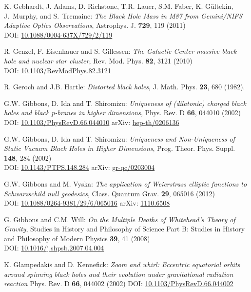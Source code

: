 \begin{thebibliography}{123}
K. Gebhardt, J. Adams, D. Richstone, T.R. Lauer, S.M. Faber, K. Gültekin, J.~Murphy, and S.~Tremaine:
{\em The Black Hole Mass in M87 from Gemini/NIFS Adaptive Optics Observations},
Astrophys. J. {\bf 729}, 119 (2011)\\
DOI: \href{https://doi.org/10.1088/0004-637X/729/2/119}{10.1088/0004-637X/729/2/119}

R. Genzel, F. Eisenhauer and S. Gillessen:
{\em The Galactic Center massive black hole and nuclear star cluster},
Rev. Mod. Phys. {\bf 82}, 3121 (2010)\\
DOI: \href{https://doi.org/10.1103/RevModPhys.82.3121}{10.1103/RevModPhys.82.3121}

R. Geroch and J.B. Hartle:
{\em Distorted black holes},
J. Math. Phys. {\bf 23}, 680 (1982).

G.W. Gibbons, D. Ida and T. Shiromizu:
{\em Uniqueness of (dilatonic) charged black holes and black p-branes in higher dimensions},
Phys. Rev. D {\bf 66}, 044010 (2002)\\
DOI: \href{https://doi.org/10.1103/PhysRevD.66.044010}{10.1103/PhysRevD.66.044010}\hfill
arXiv: \href{https://arxiv.org/abs/hep-th/0206136}{hep-th/0206136}

G.W. Gibbons, D. Ida and T. Shiromizu:
{\em Uniqueness and Non-Uniqueness of Static Vacuum Black Holes in Higher Dimensions},
Prog. Theor. Phys. Suppl. {\bf 148}, 284 (2002)\\
DOI: \href{https://doi.org/10.1143/PTPS.148.284}{10.1143/PTPS.148.284}\hfill
arXiv: \href{https://arxiv.org/abs/gr-qc/0203004}{gr-qc/0203004}

G.W. Gibbons and M. Vyska:
{\em The application of Weierstrass elliptic functions to Schwarzschild null geodesics},
Class. Quantum Grav. {\bf 29}, 065016 (2012)\\
DOI: \href{https://doi.org/10.1088/0264-9381/29/6/065016}{10.1088/0264-9381/29/6/065016}\hfill
arXiv: \href{https://arxiv.org/abs/1110.6508}{1110.6508}

G. Gibbons and C.M. Will: {\em On the Multiple Deaths of Whitehead's Theory of Gravity},
Studies in History and Philosophy of Science Part B: Studies in History and Philosophy of Modern Physics {\bf 39}, 41 (2008)\\
DOI: \href{https://doi.org/10.1016/j.shpsb.2007.04.004}{10.1016/j.shpsb.2007.04.004}

K. Glampedakis and D. Kennefick:
{\em Zoom and whirl: Eccentric equatorial orbits around spinning black holes and their evolution under gravitational radiation reaction}
Phys. Rev. D {\bf 66}, 044002 (2002)
DOI: \href{https://doi.org/10.1103/PhysRevD.66.044002}{10.1103/PhysRevD.66.044002}


\end{thebibliography}
